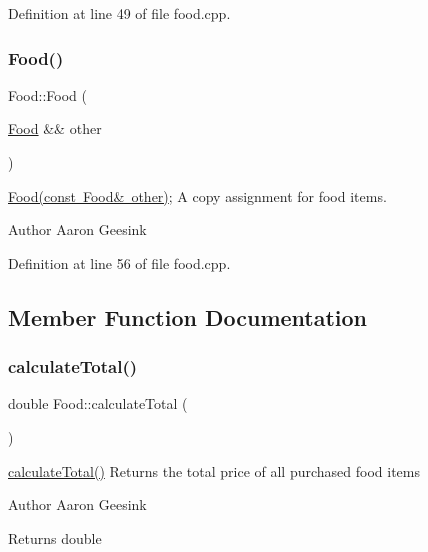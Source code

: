 Definition at line 49 of file food.\+cpp.

\mbox{\label{class_food_a82c4dcbac6b4bb4ce921bc3aea627387}} 
\subsubsection{\texorpdfstring{Food()}{Food()}\hspace{0.1cm}{\footnotesize\ttfamily [4/4]}}
{\footnotesize\ttfamily Food\+::\+Food (\begin{DoxyParamCaption}\item[{\mbox{\hyperlink{class_food}{Food}} \&\&}]{other }\end{DoxyParamCaption})}



\mbox{\hyperlink{class_food_a365c2d6175447d0fe29e57facc277570}{Food(const Food\& other)}}; A copy assignment for food items. 

\begin{DoxyAuthor}{Author}
Aaron Geesink 
\end{DoxyAuthor}


Definition at line 56 of file food.\+cpp.



\subsection{Member Function Documentation}
\mbox{\label{class_food_ac50c1e254e20ffeda0d28f84e1cc2160}} 
\subsubsection{\texorpdfstring{calculateTotal()}{calculateTotal()}}
{\footnotesize\ttfamily double Food\+::calculate\+Total (\begin{DoxyParamCaption}{ }\end{DoxyParamCaption})}



\mbox{\hyperlink{class_food_ac50c1e254e20ffeda0d28f84e1cc2160}{calculate\+Total()}} Returns the total price of all purchased food items 

\begin{DoxyAuthor}{Author}
Aaron Geesink 
\end{DoxyAuthor}
\begin{DoxyReturn}{Returns}
double 
\end{DoxyReturn}


